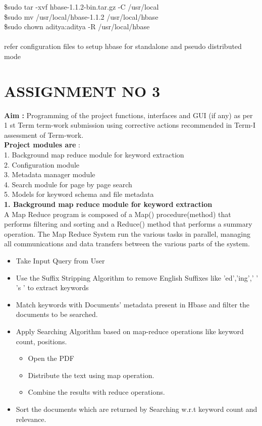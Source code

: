 \documentclass[oneside,a4paper,12pt]{report}
\begin{document}
{\begin{appendices}
\$sudo tar -xvf hbase-1.1.2-bin.tar.gz -C /usr/local \\
\$sudo mv /usr/local/hbase-1.1.2 /usr/local/hbase \\
\$sudo chown aditya:aditya -R /usr/local/hbase \\ \\

refer configuration files to setup hbase for standalone and pseudo distributed mode


\pagebreak

\section{ASSIGNMENT NO 3}

\textbf{Aim : }Programming of the project functions, interfaces and GUI (if any) as per 1 st Term term-work submission using corrective actions recommended in Term-I assessment of Term-work.\\

\noindent \textbf{Project modules are } : \\
1.	Background map reduce module for keyword extraction \\
2.	Configuration module \\
3.	Metadata manager module \\
4.	Search module for page by page search \\
5.	Models for keyword schema and file metadata \\

\noindent \textbf{1.	Background map reduce module for keyword extraction} \\
A Map Reduce program is composed of a Map() procedure(method) that performs filtering and sorting and a Reduce() method that performs a summary operation. The Map Reduce System run the various tasks in parallel, managing all communications and data transfers between the various parts of the system.\\

\begin{itemize}
\item Take Input Query from User 
\item Use the Suffix Stripping Algorithm to remove English Suffixes like ’ed’,’ing’,’ ’ ’s ’ to extract keywords 
\item Match keywords with Documents’ metadata present in Hbase and filter the documents to be searched. 
\item Apply Searching Algorithm based on map-reduce operations like keyword count, positions. 
	\begin{itemize}
		\item Open the PDF 
		\item Distribute the text using map operation. 	
		\item Combine the results with reduce operations. 
	\end{itemize}
\item Sort the documents which are returned by Searching w.r.t keyword count and relevance. 
\end{itemize}




\end{appendices}}
\end{document}

